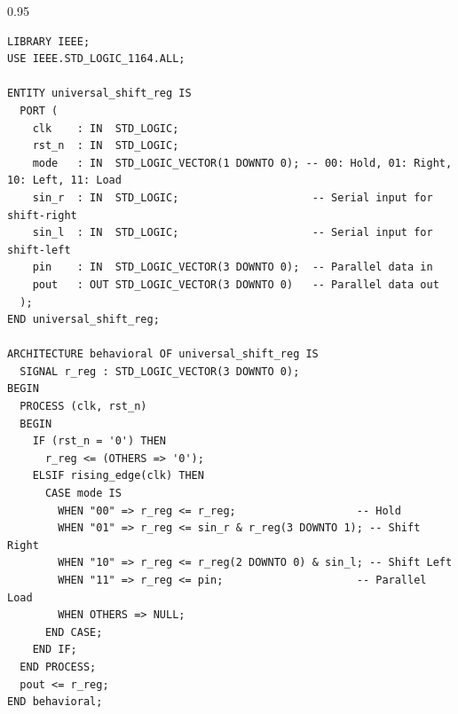\documentclass[12pt,a4paper]{article}
\begin{document}
\begin{tcolorbox}[examplebox, title={3. 4-Bit Universal Shift Register}]
\begin{spacing}{0.95}
\begin{verbatim}
LIBRARY IEEE;
USE IEEE.STD_LOGIC_1164.ALL;

ENTITY universal_shift_reg IS
  PORT (
    clk    : IN  STD_LOGIC;
    rst_n  : IN  STD_LOGIC;
    mode   : IN  STD_LOGIC_VECTOR(1 DOWNTO 0); -- 00: Hold, 01: Right, 10: Left, 11: Load
    sin_r  : IN  STD_LOGIC;                     -- Serial input for shift-right
    sin_l  : IN  STD_LOGIC;                     -- Serial input for shift-left
    pin    : IN  STD_LOGIC_VECTOR(3 DOWNTO 0);  -- Parallel data in
    pout   : OUT STD_LOGIC_VECTOR(3 DOWNTO 0)   -- Parallel data out
  );
END universal_shift_reg;

ARCHITECTURE behavioral OF universal_shift_reg IS
  SIGNAL r_reg : STD_LOGIC_VECTOR(3 DOWNTO 0);
BEGIN
  PROCESS (clk, rst_n)
  BEGIN
    IF (rst_n = '0') THEN
      r_reg <= (OTHERS => '0');
    ELSIF rising_edge(clk) THEN
      CASE mode IS
        WHEN "00" => r_reg <= r_reg;                   -- Hold
        WHEN "01" => r_reg <= sin_r & r_reg(3 DOWNTO 1); -- Shift Right
        WHEN "10" => r_reg <= r_reg(2 DOWNTO 0) & sin_l; -- Shift Left
        WHEN "11" => r_reg <= pin;                     -- Parallel Load
        WHEN OTHERS => NULL;
      END CASE;
    END IF;
  END PROCESS;
  pout <= r_reg;
END behavioral;
\end{verbatim}
\end{spacing}
\end{tcolorbox}
\end{document}
